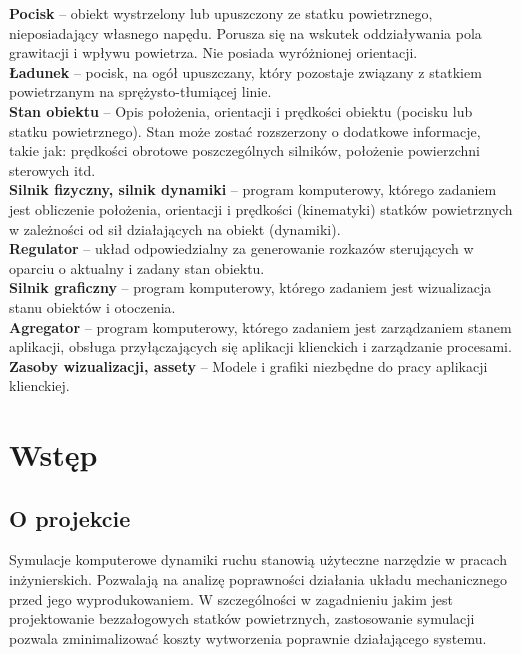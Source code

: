 \documentclass[15pt]{sprawozdanie}
\begin{document}
\textbf{Pocisk} -- obiekt wystrzelony lub upuszczony ze statku powietrznego, nieposiadający własnego napędu. Porusza się na wskutek oddziaływania pola grawitacji i wpływu powietrza. Nie posiada wyróżnionej orientacji.\\

\textbf{Ładunek} -- pocisk, na ogół upuszczany, który pozostaje związany z statkiem powietrzanym na sprężysto-tłumiącej linie. \\

\textbf{Stan obiektu} -- Opis położenia, orientacji i prędkości obiektu (pocisku lub statku powietrznego). Stan może zostać rozszerzony o dodatkowe informacje, takie jak: prędkości obrotowe poszczególnych silników, położenie powierzchni sterowych itd. \\

\textbf{Silnik fizyczny, silnik dynamiki} -- program komputerowy, którego zadaniem jest obliczenie położenia, orientacji i prędkości (kinematyki) statków powietrznych w zależności od sił działających na obiekt (dynamiki). \\

\textbf{Regulator} -- układ odpowiedzialny za generowanie rozkazów sterujących w oparciu o aktualny i zadany stan obiektu.\\

\textbf{Silnik graficzny} -- program komputerowy, którego zadaniem jest wizualizacja stanu obiektów i otoczenia.\\

\textbf{Agregator} --  program komputerowy, którego zadaniem jest zarządzaniem stanem aplikacji, obsługa przyłączających się aplikacji klienckich i zarządzanie procesami.\\

\textbf{Zasoby wizualizacji, assety} -- Modele i grafiki niezbędne do pracy aplikacji klienckiej.\\


\newpage

\section{Wstęp}

\subsection{O projekcie}

Symulacje komputerowe dynamiki ruchu stanowią użyteczne narzędzie w pracach inżynierskich. Pozwalają na analizę poprawności działania układu mechanicznego przed jego wyprodukowaniem. W szczególności w zagadnieniu jakim jest projektowanie bezzałogowych statków powietrznych, zastosowanie symulacji pozwala zminimalizować koszty wytworzenia poprawnie działającego systemu.
\end{document}

